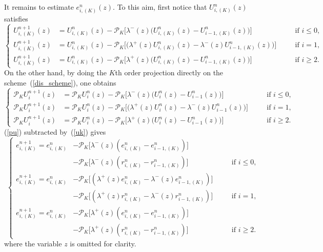 \documentclass[12pt]{article}
\theoremstyle{plain}
\theoremstyle{remark}
\theoremstyle{remark}
\theoremstyle{remark}
\numberwithin{equation}{section}
\newcommand{\p}{\mathcal{P}}
\newcommand{\Uniz}{U^n_i(z)}
\newcommand{\Unpiz}{U^{n+1}_i(z)}
\newcommand{\Unimz}{U^n_{i-1}(z)}
\newcommand{\UniK}{U^n_{i,(K)}}
\begin{document}
It remains to estimate $e^n_{i,(K)}(z)$. To this aim,  first notice that $\UniK(z)$ satisfies
\begin{equation}\label{uk}
  \left\{
  \begin{aligned}
    U^{n+1}_{i,(K)}(z) &= \UniK(z) - \p_K \big[\lambda^-(z)\big(\UniK(z) - U^n_{i-1,(K)}(z)\big)\big] &\quad&\text{if $i\leq 0$}, \\
    U^{n+1}_{i,(K)}(z) &= \UniK(z) - \p_K \big[\big(\lambda^+(z)\UniK(z) - \lambda^-(z)U^n_{i-1,(K)}(z)\big)\big] && \text{if $i = 1$}, \\
    U^{n+1}_{i,(K)}(z) &= \UniK(z) - \p_K \big[\lambda^+(z)\big(\UniK(z) - U^n_{i-1,(K)}(z)\big)\big] && \text{if $i\geq 2$}.
  \end{aligned}
  \right.
\end{equation}
On the other hand, by doing the $K$th order projection directly on the scheme~(\ref{dis_scheme}), one obtains
\begin{equation}\label{pu}
  \left\{
  \begin{aligned}
    \p_K\Unpiz &= \p_K\Uniz - \p_K\big[\lambda^-(z)\big(\Uniz - \Unimz)\big] &\quad& \mbox{if } i\leq 0, \\
    \p_K\Unpiz &= \p_K\Uniz - \p_K\big[\big(\lambda^+(z)\Uniz - \lambda^-(z)\Unimz)\big] && \text{if $i = 1$}, \\
    \p_K\Unpiz &= \p_K\Uniz - \p_K\big[\lambda^+(z)\big(\Uniz - \Unimz)\big] && \text{if $i\geq 2$}. 
  \end{aligned}
  \right.
\end{equation}
(\ref{pu}) subtracted by~(\ref{uk}) gives
\begin{equation}\label{ek}
  \left\{
  \begin{aligned}
    e^{n+1}_{i,(K)} = e^n_{i,(K)} & - \p_K \big[\lambda^-(z)(e^n_{i,(K)} - e^n_{i-1,(K)})\big] \\
                    & - \p_K \big[\lambda^-(z)(r^n_{i,(K)} - r^n_{i-1,(K)})\big] &\quad&\text{if $i\leq 0$}, \\
    e^{n+1}_{i,(K)} = e^n_{i,(K)} &- \p_K \big[(\lambda^+(z)e^n_{i,(K)} - \lambda^-(z)e^n_{i-1,(K)})\big] \\
                    & - \p_K \big[(\lambda^+(z)r^n_{i,(K)} - \lambda^-(z)r^n_{i-1,(K)})\big]&& \text{if $i = 1$}, \\
    e^{n+1}_{i,(K)} = e^n_{i,(K)} &- \p_K \big[\lambda^+(z)(e^n_{i,(K)} - e^n_{i-1,(K)})\big] \\
                    & - \p_K \big[\lambda^+(z)(r^n_{i,(K)} - r^n_{i-1,(K)})\big] && \text{if $i\geq 2$}.
  \end{aligned}
  \right.
\end{equation}
where  the variable $z$ is omitted for clarity.
\end{document}
